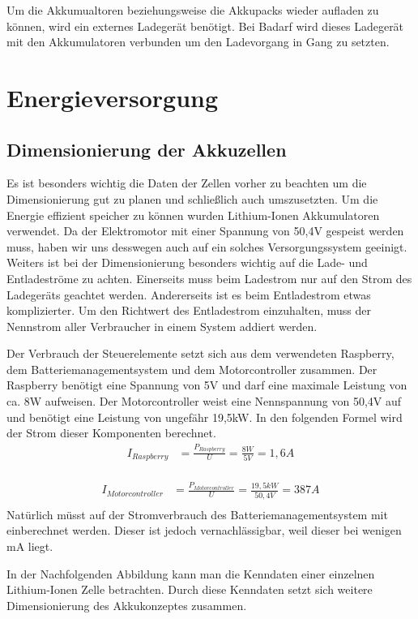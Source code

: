 Um die Akkumualtoren beziehungsweise die Akkupacks wieder aufladen zu können, wird ein externes Ladegerät benötigt. Bei Badarf wird dieses Ladegerät mit den Akkumulatoren verbunden um den Ladevorgang in Gang zu setzten.
\newpage

\section{Energieversorgung}
\subsection{Dimensionierung der Akkuzellen}
Es ist besonders wichtig die Daten der Zellen vorher zu beachten um die Dimensionierung gut zu planen und schließlich auch umszusetzten. Um die Energie effizient speicher zu können wurden Lithium-Ionen Akkumulatoren verwendet. Da der Elektromotor mit einer Spannung von 50,4V gespeist werden muss, haben wir uns desswegen auch auf ein solches Versorgungssystem geeinigt. Weiters ist bei der Dimensionierung besonders wichtig auf die Lade- und Entladeströme zu achten. Einerseits muss beim Ladestrom nur auf den Strom des Ladegeräts geachtet werden. Andererseits ist es beim Entladestrom etwas komplizierter. Um den Richtwert des Entladestrom einzuhalten, muss der Nennstrom aller Verbraucher in einem System addiert werden.

Der Verbrauch der Steuerelemente setzt sich aus dem verwendeten Raspberry, dem Batteriemanagementsystem und dem Motorcontroller zusammen. Der Raspberry benötigt eine Spannung von 5V und darf eine maximale Leistung von ca. 8W aufweisen. Der Motorcontroller weist eine Nennspannung von 50,4V auf und benötigt eine Leistung von ungefähr 19,5kW. In den folgenden Formel wird der Strom dieser Komponenten berechnet.
\begin{align*}
I_{Raspberry} &= \frac{P_{Raspberry}}{U}=\frac{8 W}{5 V} = 1,6A\\
\end{align*}

\begin{align*}
I_{Motorcontroller} &= \frac{P_{Motorcontroller}}{U}=\frac{19,5 kW}{50,4 V} = 387 A\\
\end{align*}
Natürlich müsst auf der Stromverbrauch des Batteriemanagementsystem mit einberechnet werden. Dieser ist jedoch vernachlässigbar, weil dieser bei wenigen mA liegt.
\newpage

In der Nachfolgenden Abbildung kann man die Kenndaten einer einzelnen Lithium-Ionen Zelle betrachten. Durch diese Kenndaten setzt sich weitere Dimensionierung des Akkukonzeptes zusammen. 

